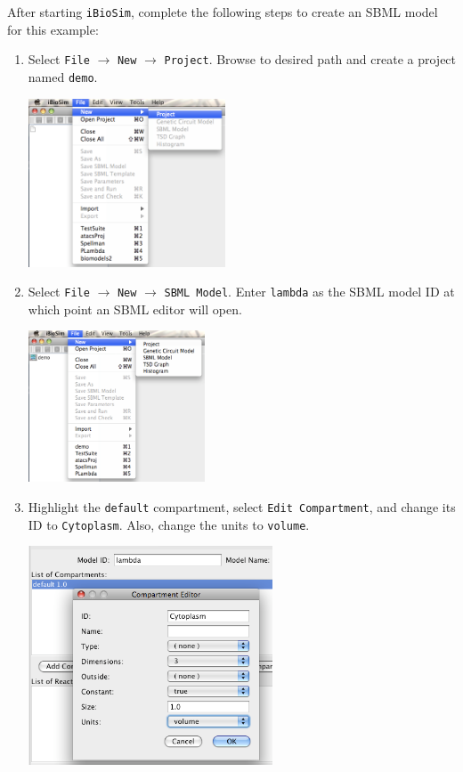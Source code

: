 \documentclass[titlepage,11pt]{article}
\begin{document}
\noindent
After starting {\tt iBioSim}, complete the following steps to create
an SBML model for this example:
\begin{enumerate}
\item Select {\tt File} $\rightarrow$ {\tt New} $\rightarrow$ {\tt Project}.
      Browse to desired path and create a project named {\tt demo}.

\includegraphics[height=50mm]{screenshots/project}

\item Select {\tt File} $\rightarrow$ {\tt New} $\rightarrow$ {\tt SBML Model}.
      Enter {\tt lambda} as the SBML model ID at which point an SBML
      editor will open.

\includegraphics[height=45mm]{screenshots/newModel}

\clearpage

\item Highlight the {\tt default} compartment, select {\tt Edit
    Compartment}, and change its ID to {\tt Cytoplasm}.  Also, change 
    the units to {\tt volume}.

\includegraphics[height=65mm]{screenshots/compartment}


\end{enumerate}
\end{document}
